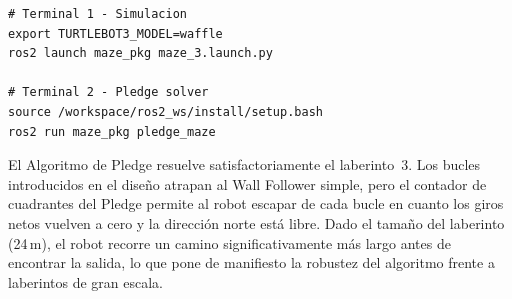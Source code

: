 \begin{lstlisting}[style=bash]
# Terminal 1 - Simulacion
export TURTLEBOT3_MODEL=waffle
ros2 launch maze_pkg maze_3.launch.py

# Terminal 2 - Pledge solver
source /workspace/ros2_ws/install/setup.bash
ros2 run maze_pkg pledge_maze
\end{lstlisting}

El Algoritmo de Pledge resuelve satisfactoriamente el laberinto~3. Los bucles
introducidos en el diseño atrapan al Wall Follower simple, pero el contador de
cuadrantes del Pledge permite al robot escapar de cada bucle en cuanto los giros
netos vuelven a cero y la dirección norte está libre. Dado el tamaño del laberinto
(24\,m), el robot recorre un camino significativamente más largo antes de encontrar
la salida, lo que pone de manifiesto la robustez del algoritmo frente a laberintos
de gran escala.
